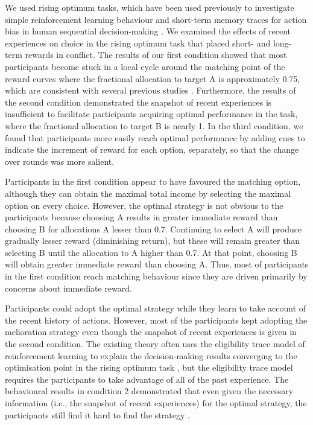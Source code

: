 \documentclass[twocolumn]{article}
\begin{document}
We used rising optimum tasks, which have been used previously to
investigate simple reinforcement learning behaviour and short-term
memory traces for action bias in human sequential decision-making
\cite{RN2}. We examined the effects of recent experiences on choice in
the rising optimum task that placed short- and long-term rewards in
conflict. The results of our first condition showed that most
participants become stuck in a local cycle around the matching point
of the reward curves where the fractional allocation to target A is
approximately 0.75, which are consistent with several previous studies
\cite{RN2,RN12}. Furthermore, the results of the second condition
demonstrated the snapshot of recent experiences is insufficient to
facilitate participants acquiring optimal performance in the task,
where the fractional allocation to target B is nearly 1. In the third
condition, we found that participants more easily reach optimal
performance by adding cues to indicate the increment of reward for
each option, separately, so that the change over rounds was more
salient.

Participants in the first condition appear to have favoured the
matching option, although they can obtain the maximal total income by
selecting the maximal option on every choice. However, the optimal
strategy is not obvious to the participants because choosing A results
in greater immediate reward than choosing B for allocations A lesser
than 0.7. Continuing to select A will produce gradually lesser reward
(diminishing return), but these will remain greater than selecting B
until the allocation to A higher than 0.7. At that point, choosing B
will obtain greater immediate reward than choosing A. Thus, most of
participants in the first condition reach matching behaviour since
they are driven primarily by concerns about immediate reward.

Participants could adopt the optimal strategy while they learn to take
account of the recent history of actions. However, most of the
participants kept adopting the melioration strategy even though the
snapshot of recent experiences is given in the second condition.  The
existing theory often uses the eligibility trace model of
reinforcement learning to explain the decision-making results
converging to the optimisation point in the rising optimum task
\cite{RN2,RN16}, but the eligibility trace model requires the
participants to take advantage of all of the past experience. The
behavioural results in condition 2 demonstrated that even given the
necessary information (i.e., the snapshot of recent experiences) for
the optimal strategy, the participants still find it hard to find the
strategy \cite{RN21,RN22,RN15}.
\end{document}
